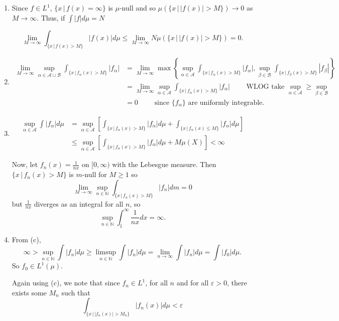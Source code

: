 \documentclass[12pt]{Qual}
\begin{document}
\begin{solution}$\,$
\begin{enumerate}[label=(\alph*)]
    \item Since $f\in L^1$, $\{x\,|\,f(x)=\infty\}$ is $\mu$-null and so $\mu(\{x\,|\,|f(x)|>M\})\to0$ as $M\to\infty$. Thus, if $\int|f|d\mu=N$

    $$\lim_{M\to\infty}\int_{\{x\,|\,f(x)>M\}}|f(x)|d\mu\le\lim_{M\to\infty}N\mu(\{x\,|\,|f(x)|>M\})=0.$$
    \item \begin{align*}
        \lim_{M\to\infty}\sup_{\alpha\in\mathscr{A}\cup\mathscr{B}}\int_{\{x\,|\,f_\alpha(x)>M\}}|f_\alpha|&=\lim_{M\to\infty}\max\left\{\sup_{\alpha\in\mathscr{A}}\int_{\{x\,|\,f_\alpha(x)>M\}}|f_\alpha|,\sup_{\beta\in\mathscr{B}}\int_{\{x\,|\,f_\beta(x)>M\}}|f_\beta|\right\}\\
        &=\lim_{M\to\infty}\sup_{\alpha\in\mathscr{A}}\int_{\{x\,|\,f_\alpha(x)>M\}}|f_\alpha|\qquad\text{ WLOG take }\sup_{\alpha\in\mathscr{A}}\ge\sup_{\beta\in\mathscr{B}}\\
        &=0\qquad\text{ since }\{f_\alpha\}\text{ are uniformly integrable}.
    \end{align*}

    \item \begin{align*}
        \sup_{\alpha\in\mathscr{A}}\int|f_\alpha|d\mu&=\sup_{\alpha\in\mathscr{A}}\left[\int_{\{x\,|\,f_\alpha(x)>M\}}|f_\alpha|d\mu+\int_{\{x\,|\,f_\alpha(x)\le M\}}|f_\alpha|d\mu\right]\\
        &\le\sup_{\alpha\in\mathscr{A}}\left[\int_{\{x\,|\,f_\alpha(x)>M\}}|f_\alpha|d\mu+M\mu(X)\right]<\infty
    \end{align*}

    Now, let $f_n(x)=\frac{1}{nx}$ on $[0,\infty)$ with the Lebesgue measure. Then $\{x\,|\,f_n(x)>M\}$ is $m$-null for $M\ge1$ so $$\lim_{M\to\infty}\sup_{n\in\mathbb{N}}\int_{\{x\,|\,f_n(x)>M\}}|f_n|dm=0$$ but $\frac{1}{nx}$ diverges as an integral for all $n$, so $$\sup_{n\in\mathbb{N}}\int_1^\infty\frac{1}{nx}dx=\infty.$$
    \item From (c), $$\infty>\sup_{n\in\mathbb{N}}\int|f_n|d\mu\ge\limsup_{n\in\mathbb{N}}\int|f_n|d\mu=\lim_{n\to\infty}\int|f_n|d\mu=\int|f_0|d\mu.$$ So $f_0\in L^1(\mu)$.

    Again using (c), we note that since $f_n\in L^1$, for all $n$ and for all $\varepsilon>0$, there exists some $M_n$ such that $$\int_{\{x\,|\,|f_n(x)|>M_n\}}|f_n(x)|d\mu<\varepsilon$$


\end{enumerate}
\end{solution}
\end{document}
